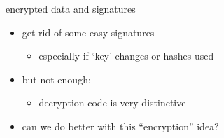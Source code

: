 
\begin{frame}{encrypted data and signatures}
    \begin{itemize}
    \item get rid of some easy signatures
        \begin{itemize}
        \item especially if `key' changes or hashes used
        \end{itemize}
    \item but not enough:
        \begin{itemize}
        \item decryption code is very distinctive
        \end{itemize}
    \vspace{.5cm}
    \item<2-> can we do better with this ``encryption'' idea?
    \end{itemize}
\end{frame}

